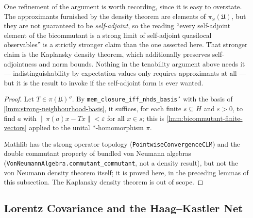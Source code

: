 \begin{theorem}
    One refinement of the argument is worth recording, since it is easy to overstate. The approximants furnished by the density theorem are elements of $\pi_\omega(\mathfrak{U})$, but they are not guaranteed to be \emph{self-adjoint}, so the reading ``every self-adjoint element of the bicommutant is a strong limit of self-adjoint quasilocal observables'' is a strictly stronger claim than the one asserted here. That stronger claim is the Kaplansky density theorem, which additionally preserves self-adjointness and norm bounds. Nothing in the tenability argument above needs it --- indistinguishability by expectation values only requires approximants at all --- but it is the result to invoke if the self-adjoint form is ever wanted.
\end{theorem}
\begin{proof}
    \leanok
    Let $T \in \pi(\mathfrak{U})''$. By \texttt{mem\_closure\_iff\_nhds\_basis'} with the basis of \ref{lmm:strong-neighbourhood-basis}, it suffices, for each finite $s \subseteq H$ and $\varepsilon > 0$, to find $a$ with $\lVert \pi(a)x - Tx \rVert < \varepsilon$ for all $x \in s$; this is \ref{lmm:bicommutant-finite-vectors} applied to the unital $*$-homomorphism $\pi$.

    Mathlib has the strong operator topology (\texttt{PointwiseConvergenceCLM}) and the double commutant property of bundled von Neumann algebras (\texttt{VonNeumannAlgebra.commutant\_commutant}, not a density result), but not the von Neumann density theorem itself; it is proved here, in the preceding lemmas of this subsection. The Kaplansky density theorem is out of scope.
\end{proof}

\subsection{Lorentz Covariance and the Haag--Kastler Net}

